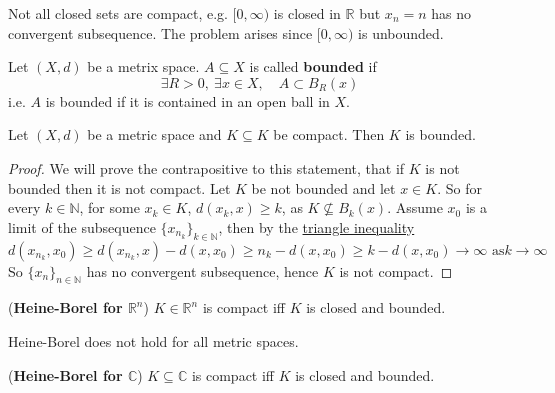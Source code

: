 \begin{example}
	Not all closed sets are compact, e.g. $[0, \infty)$ is closed in $\mathbb{R}$ but $x_n = n$ has no convergent subsequence. The problem arises since $[0, \infty)$ is unbounded.
\end{example}

\begin{definition}\label{def:boundedSet}
	Let $(X, d)$ be a metrix space. $A \subseteq X$ is called \textbf{bounded} if
	\[
		\exists R > 0, \ \exists x \in X, \quad A \subset B_R(x)
	\]
	i.e. $A$ is bounded if it is contained in an open ball in $X$.
\end{definition}

\begin{lemma}\label{lem:compactSetsBounded}
	Let $(X, d)$ be a metric space and $K \subseteq K$ be compact. Then $K$ is bounded.
\end{lemma}

\begin{proof}
	We will prove the contrapositive to this statement, that if $K$ is not bounded then it is not compact. Let $K$ be not bounded and let $x \in K$. So for every $k \in \mathbb{N}$, for some $x_k \in K$, $d(x_k, x) \ge k$, as $K \not\subseteq B_k(x)$. Assume $x_0$ is a limit of the subsequence $\{ x_{n_k} \}_{k \in \mathbb{N}}$, then by the \hyperref[def:metricSpace]{triangle inequality}
	\[
		d(x_{n_k}, x_0) \ge d(x_{n_k}, x) - d(x, x_0) \ge n_k - d(x, x_0) \ge k - d(x, x_0) \to \infty \text{ as} k \to \infty
	\]
	So $\{ x_n \}_{n \in \mathbb{N}}$ has no convergent subsequence, hence $K$ is not compact.
\end{proof}

\begin{theorem}
	(\textbf{Heine-Borel for $\mathbb{R}^n$}) $K \in \mathbb{R}^n$ is compact iff $K$ is closed and bounded.
\end{theorem}

\begin{remark}
	Heine-Borel does not hold for all metric spaces.
\end{remark}

\begin{theorem}
	(\textbf{Heine-Borel for $\mathbb{C}$}) $K \subseteq \mathbb{C}$ is compact iff $K$ is closed and bounded.
\end{theorem}

